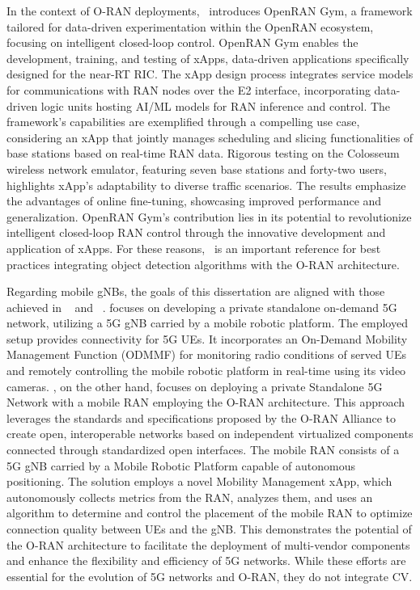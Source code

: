 In the context of O-RAN deployments,~\cite{xApps} introduces OpenRAN Gym, a framework tailored for data-driven experimentation within the OpenRAN ecosystem, focusing on intelligent closed-loop control.
OpenRAN Gym enables the development, training, and testing of xApps, data-driven applications specifically designed for the near-RT RIC. The xApp design process integrates service models for communications with RAN nodes over the E2 interface, incorporating data-driven logic units hosting AI/ML models for RAN inference and control.
The framework's capabilities are exemplified through a compelling use case, considering an xApp that jointly manages scheduling and slicing functionalities of base stations based on real-time RAN data.
Rigorous testing on the Colosseum wireless network emulator, featuring seven base stations and forty-two users, highlights xApp's adaptability to diverse traffic scenarios.
The results emphasize the advantages of online fine-tuning, showcasing improved performance and generalization.
OpenRAN Gym's contribution lies in its potential to revolutionize intelligent closed-loop RAN control through the innovative development and application of xApps.
For these reasons,~\cite{xApps} is an important reference for best practices integrating object detection algorithms with the O-RAN architecture.

Regarding mobile gNBs, the goals of this dissertation are aligned with those achieved in ~\cite{maia2022control} and ~\cite{queiros2023autonomous}.
\cite{maia2022control} focuses on developing a private standalone on-demand 5G network, utilizing a 5G gNB carried by a mobile robotic platform.
The employed setup provides connectivity for 5G UEs.
It incorporates an On-Demand Mobility Management Function (ODMMF) for monitoring radio conditions of served UEs and remotely controlling the mobile robotic platform in real-time using its video cameras.
\cite{queiros2023autonomous}, on the other hand, focuses on deploying a private Standalone 5G Network with a mobile RAN employing the O-RAN architecture.
This approach leverages the standards and specifications proposed by the O-RAN Alliance to create open, interoperable networks based on independent virtualized components connected through standardized open interfaces.
The mobile RAN consists of a 5G gNB carried by a Mobile Robotic Platform capable of autonomous positioning.
The solution employs a novel Mobility Management xApp, which autonomously collects metrics from the RAN, analyzes them, and uses an algorithm to determine and control the placement of the mobile RAN to optimize connection quality between UEs and the gNB.
This demonstrates the potential of the O-RAN architecture to facilitate the deployment of multi-vendor components and enhance the flexibility and efficiency of 5G networks.
While these efforts are essential for the evolution of 5G networks and O-RAN, they do not integrate CV\@.

